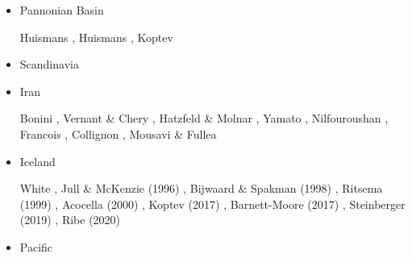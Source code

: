 \begin{itemize}
\item Pannonian Basin 

\begin{scriptsize}
Huismans \etal \cite{hupc01b},
Huismans \etal \cite{hupc02},
Koptev \etal \cite{kock21}
\end{scriptsize}

\item Scandinavia  
{\scriptsize
\cite{ramb80}
\cite{bovc14}
}
\item Iran

\begin{scriptsize}
Bonini \etal \cite{bocs03},
Vernant \&  Chery \cite{vech06},
Hatzfeld \& Molnar \cite{hamo10},
Yamato \etal \cite{yakm11},
Nilfouroushan \etal \cite{nipc13},
Francois \etal \cite{frba14},
Collignon \etal \cite{coyc16},
Mousavi \& Fullea \cite{mofu20}
\end{scriptsize} 
 

\item Iceland

\begin{scriptsize}
White \cite{whit89},
Jull \& McKenzie (1996) \cite{jumc96},
Bijwaard \& Spakman  (1998) \cite{bisp98},
Ritsema \etal (1999) \cite{rivw99},
Acocella \etal  (2000) \cite{acgf00},
Koptev \etal (2017) \cite{kocb17},
Barnett-Moore \etal (2017) \cite{bahf17},
Steinberger \etal (2019) \cite{stbl19},
Ribe \etal (2020) \cite{rits20}
\end{scriptsize} 

\item Pacific 


\end{itemize}
